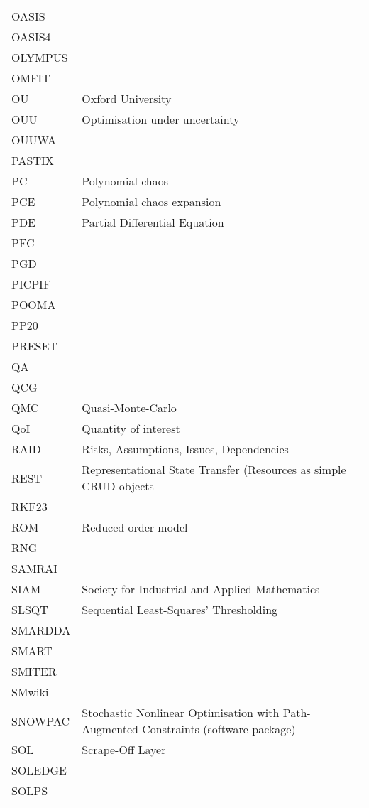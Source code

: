 \begin{longtable}{|p{4.0cm}|p{12.0cm}|}
OASIS & \\
OASIS4 & \\
OLYMPUS & \\
OMFIT & \\
OU & Oxford University \\
OUU & Optimisation under uncertainty \\
OUUWA & \\
PASTIX & \\
PC & Polynomial chaos \\
PCE & Polynomial chaos expansion \\
PDE & Partial Differential Equation \\ 
PFC & \\
PGD & \\
PICPIF & \\
POOMA & \\
PP20 & \\
PRESET & \\
QA & \\
QCG  & \\
QMC & Quasi-Monte-Carlo \\
QoI & Quantity of interest \\
RAID & Risks, Assumptions, Issues, Dependencies \\
REST & Representational State Transfer (Resources as simple CRUD objects \\
RKF23 & \\
ROM & Reduced-order model \\
RNG & \\
SAMRAI & \\
SIAM & Society for Industrial and Applied Mathematics \\
SLSQT & Sequential Least-Squares' Thresholding \\
SMARDDA & \\
SMART & \\
SMITER & \\
SMwiki & \\
SNOWPAC & Stochastic Nonlinear Optimisation with Path-Augmented Constraints (software package) \\
SOL & Scrape-Off Layer \\
SOLEDGE & \\
SOLPS & \\

\end{longtable}
